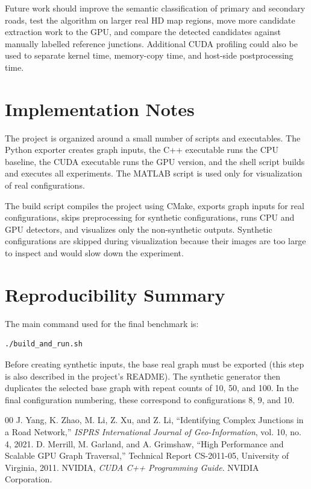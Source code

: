 \documentclass[conference]{IEEEtran}
\begin{document}
Future work should improve the semantic classification of primary and secondary roads, test the algorithm on larger real HD map regions, move more candidate extraction work to the GPU, and compare the detected candidates against manually labelled reference junctions. Additional CUDA profiling could also be used to separate kernel time, memory-copy time, and host-side postprocessing time.

\appendices
\section{Implementation Notes}

The project is organized around a small number of scripts and executables. The Python exporter creates graph inputs, the C++ executable runs the CPU baseline, the CUDA executable runs the GPU version, and the shell script builds and executes all experiments. The MATLAB script is used only for visualization of real configurations.

The build script compiles the project using CMake, exports graph inputs for real configurations, skips preprocessing for synthetic configurations, runs CPU and GPU detectors, and visualizes only the non-synthetic outputs. Synthetic configurations are skipped during visualization because their images are too large to inspect and would slow down the experiment.

\section{Reproducibility Summary}

The main command used for the final benchmark is:
\begin{verbatim}
./build_and_run.sh
\end{verbatim}

Before creating synthetic inputs, the base real graph must be exported (this step is also described in the project's README). The synthetic generator then duplicates the selected base graph with repeat counts of 10, 50, and 100. In the final configuration numbering, these correspond to configurations 8, 9, and 10.

\begin{thebibliography}{00}
 J. Yang, K. Zhao, M. Li, Z. Xu, and Z. Li, ``Identifying Complex Junctions in a Road Network,'' \textit{ISPRS International Journal of Geo-Information}, vol. 10, no. 4, 2021.
 D. Merrill, M. Garland, and A. Grimshaw, ``High Performance and Scalable GPU Graph Traversal,'' Technical Report CS-2011-05, University of Virginia, 2011.
 NVIDIA, \textit{CUDA C++ Programming Guide}. NVIDIA Corporation.
\end{thebibliography}
\end{document}

